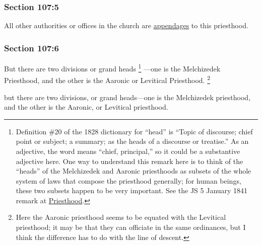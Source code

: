 	\subsubsection{Section 107:5} %
		\label{DC107-5}

		All other authorities or offices in the church are \hyperref[APPENDAGE]{appendages} to this priesthood.


	\subsubsection{Section 107:6} %
		\label{DC107-6}

		But there are two divisions or grand heads%
			\footnote{%
				Definition \#20 of the 1828 dictionary for ``head'' is ``Topic of discourse; chief point or subject; a summary; as the heads of a discourse or treatise.'' As an adjective, the word means ``chief, principal,'' so it could be a substantive adjective here. One way to understand this remark here is to think of the ``heads'' of the Melchizedek and Aaronic priesthoods as subsets of the whole system of laws that compose the priesthood generally; for human beings, these two subsets happen to be very important. See the JS 5 January 1841 remark at \hyperref[PRIESTHOOD-JS]{Priesthood}.
				}%
		---one is the Melchizedek Priesthood, and the other is the Aaronic or Levitical Priesthood.%
			\footnote{%
				Here the Aaronic priesthood seems to be equated with the Levitical priesthood; it may be that they can officiate in the same ordinances, but I think the difference has to do with the line of descent.
				}

		\begin{framed}
		\scriptsize
			\begin{compactdesc}
				\item[JSP] but there are two divisions, or grand heads---one is the Melchizedek priesthood, and the other is the Aaronic, or Levitical priesthood.
			\end{compactdesc}
		\end{framed}


